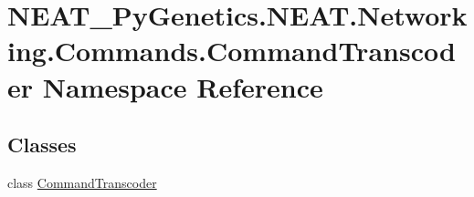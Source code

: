 \hypertarget{namespaceNEAT__PyGenetics_1_1NEAT_1_1Networking_1_1Commands_1_1CommandTranscoder}{}\section{N\+E\+A\+T\+\_\+\+Py\+Genetics.\+N\+E\+A\+T.\+Networking.\+Commands.\+Command\+Transcoder Namespace Reference}
\label{namespaceNEAT__PyGenetics_1_1NEAT_1_1Networking_1_1Commands_1_1CommandTranscoder}
\subsection*{Classes}
\begin{DoxyCompactItemize}
\item 
class \hyperlink{classNEAT__PyGenetics_1_1NEAT_1_1Networking_1_1Commands_1_1CommandTranscoder_1_1CommandTranscoder}{Command\+Transcoder}
\end{DoxyCompactItemize}
